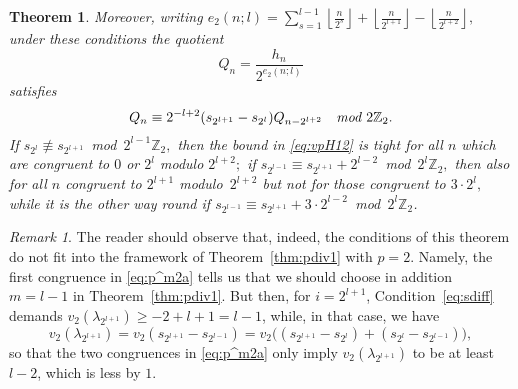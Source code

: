 \documentclass[12pt,reqno]{amsart}
\numberwithin{equation}{section}
\newtheorem{theorem}{Theorem}
\theoremstyle{remark}
\newtheorem*{remark}{Remark}
\begin{document}
\begin{theorem}
Moreover, writing 
$e_2(n;l)=\sum_{s=1}^{l-1}{\left\lfloor{\frac {n} {2^{s}}}\right\rfloor}
+{\left\lfloor{\frac {n} {2^{l+1}}}\right\rfloor} 
-{\left\lfloor{\frac {n} {2^{l+2}}}\right\rfloor},$ 
under these conditions the quotient
\begin{equation*} 
Q_n=\frac {h_n} 
{2^{e_2(n;l)}}
\end{equation*}
satisfies
\begin{equation} \label{eq:Qrek12} 
Q_n\equiv 2^{-l+2}(s_{2^{l+1}}-s_{2^{l}})Q_{n-2^{l+2}} 
\quad \text{\em mod $2{\mathbb{Z}}_2$}.
\end{equation}
If 
\hbox{$s_{2^{l}}\not\equiv s_{2^{l+1}}$~{\em mod~$2^{l-1}{\mathbb{Z}}_2,$}}
then the bound in \eqref{eq:vpH12} is tight for all $n$ which 
are congruent to $0$ or $2^l$ modulo $2^{l+2};$ if
\hbox{$s_{2^{l-1}}\equiv s_{2^{l+1}}+2^{l-2}$~{\em mod~$2^{l}{\mathbb{Z}}_2,$}}
then also for all $n$ congruent to $2^{l+1}$ modulo~$2^{l+2}$ but not
for those congruent to $3\cdot 2^l,$ while it is the other way round
if
\hbox{$s_{2^{l-1}}\equiv s_{2^{l+1}}+3\cdot2^{l-2}$~{\em mod~$2^{l}{\mathbb{Z}}_2$}}.
\end{theorem}

\begin{remark}
The reader should observe that, indeed, the conditions of this theorem
do not fit into the framework of Theorem~\ref{thm:pdiv1} with $p=2$.
Namely, the first congruence in \eqref{eq:p^m2a} tells us that we
should choose in addition $m=l-1$ in Theorem~\ref{thm:pdiv1}.
But then, for $i=2^{l+1}$, Condition~\eqref{eq:sdiff}
demands $v_2({\lambda}_{2^{l+1}})\ge -2+l+1=l-1$, while, 
in that case, we have
$$v_2({\lambda}_{2^{l+1}})=
v_2(s_{2^{l+1}}-s_{2^{l-1}})
=v_2\big((s_{2^{l+1}}-s_{2^{l}})+(s_{2^{l}}-s_{2^{l-1}})\big),
$$ 
so that the two congruences in
\eqref{eq:p^m2a} only imply $v_2({\lambda}_{2^{l+1}})$
to be at least $l-2$, which is less by $1$.
\end{remark}
\end{document}
